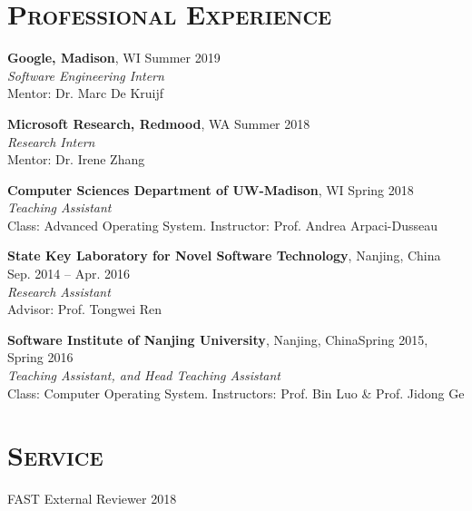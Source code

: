 \documentclass[10pt, letterpaper]{article}
\renewenvironment{itemize}{
  \begin{list}{}{
    \setlength{\leftmargin}{1.2em}
    \setlength{\itemsep}{0.12em}
    \setlength{\parskip}{0pt}
    \setlength{\parsep}{0.12em}
  }
}{
  \end{list}
}
\begin{document}
\section*{\textsc{Professional Experience}}

\begin{itemize}

\item {\bf Google, Madison}, WI \hfill Summer 2019\\
{\it Software Engineering Intern} \\Mentor: Dr. Marc De Kruijf

\item {\bf Microsoft Research, Redmood}, WA \hfill Summer 2018\\
{\it Research Intern} \\Mentor: Dr. Irene Zhang

\item {\bf Computer Sciences Department of UW-Madison}, WI \hfill Spring 2018\\
{\it Teaching Assistant} \\Class: Advanced Operating System. Instructor: Prof. Andrea Arpaci-Dusseau

\item {\bf State Key Laboratory for Novel Software Technology}, Nanjing, China
  \hfill Sep. 2014 -- Apr. 2016\\
{\it Research Assistant} \\Advisor: Prof. Tongwei Ren

\item {\bf Software Institute of Nanjing University}, Nanjing, China\hfill Spring 2015, Spring 2016\\
{\it Teaching Assistant, and Head Teaching Assistant} 
 \\Class: Computer Operating System. Instructors: Prof. Bin Luo \& Prof. Jidong Ge
\end{itemize}


\section*{\textsc{Service}}
\begin{itemize}
	\item FAST External Reviewer \hfill 2018
\end{itemize}
\end{document}
